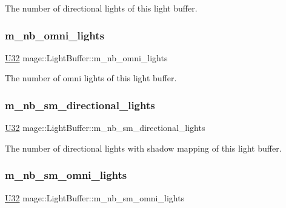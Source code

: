 The number of directional lights of this light buffer. \hypertarget{structmage_1_1_light_buffer_ad576a2cf65d5c84761812144274ac779}{}\label{structmage_1_1_light_buffer_ad576a2cf65d5c84761812144274ac779} 
\subsubsection{\texorpdfstring{m\+\_\+nb\+\_\+omni\+\_\+lights}{m\_nb\_omni\_lights}}
{\footnotesize\ttfamily \hyperlink{namespacemage_a41c104c036fba3756a74e19f793eeaa1}{U32} mage\+::\+Light\+Buffer\+::m\+\_\+nb\+\_\+omni\+\_\+lights}

The number of omni lights of this light buffer. \hypertarget{structmage_1_1_light_buffer_a3f2bee584a95ff4e41a02558c45bba94}{}\label{structmage_1_1_light_buffer_a3f2bee584a95ff4e41a02558c45bba94} 
\subsubsection{\texorpdfstring{m\+\_\+nb\+\_\+sm\+\_\+directional\+\_\+lights}{m\_nb\_sm\_directional\_lights}}
{\footnotesize\ttfamily \hyperlink{namespacemage_a41c104c036fba3756a74e19f793eeaa1}{U32} mage\+::\+Light\+Buffer\+::m\+\_\+nb\+\_\+sm\+\_\+directional\+\_\+lights}

The number of directional lights with shadow mapping of this light buffer. \hypertarget{structmage_1_1_light_buffer_afef9d26eab5ebc74272c23b208f1ba0a}{}\label{structmage_1_1_light_buffer_afef9d26eab5ebc74272c23b208f1ba0a} 
\subsubsection{\texorpdfstring{m\+\_\+nb\+\_\+sm\+\_\+omni\+\_\+lights}{m\_nb\_sm\_omni\_lights}}
{\footnotesize\ttfamily \hyperlink{namespacemage_a41c104c036fba3756a74e19f793eeaa1}{U32} mage\+::\+Light\+Buffer\+::m\+\_\+nb\+\_\+sm\+\_\+omni\+\_\+lights}

